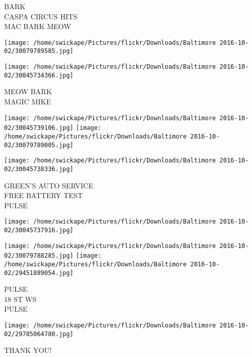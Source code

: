 \documentclass[10pt,letterpaper]{article}
\begin{document}
BARK\\
CASPA CIRCUS HITS\\
MAC BARK MEOW
\pagebreak

\texttt{[image: /home/swickape/Pictures/flickr/Downloads/Baltimore 2016-10-02/30079789585.jpg]}

\vspace{0.25in}
\texttt{[image: /home/swickape/Pictures/flickr/Downloads/Baltimore 2016-10-02/30045734366.jpg]}

MEOW BARK\\
MAGIC MIKE
\pagebreak

\texttt{[image: /home/swickape/Pictures/flickr/Downloads/Baltimore 2016-10-02/30045739106.jpg]}
\texttt{[image: /home/swickape/Pictures/flickr/Downloads/Baltimore 2016-10-02/30079789005.jpg]}

\texttt{[image: /home/swickape/Pictures/flickr/Downloads/Baltimore 2016-10-02/30045738336.jpg]}

GREEN'S AUTO SERVICE\\
FREE BATTERY TEST\\
PULSE
\pagebreak

\texttt{[image: /home/swickape/Pictures/flickr/Downloads/Baltimore 2016-10-02/30045737916.jpg]}

\vspace{0.25in}
\texttt{[image: /home/swickape/Pictures/flickr/Downloads/Baltimore 2016-10-02/30079788285.jpg]}
\texttt{[image: /home/swickape/Pictures/flickr/Downloads/Baltimore 2016-10-02/29451889054.jpg]}

PULSE\\
18 ST WS\\
PULSE
\pagebreak

\texttt{[image: /home/swickape/Pictures/flickr/Downloads/Baltimore 2016-10-02/29785064780.jpg]}

THANK YOU!
\pagebreak
\end{document}
